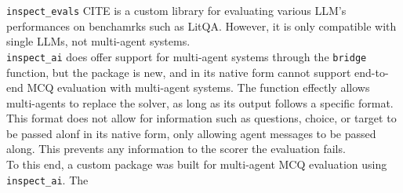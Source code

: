 \texttt{inspect_evals} CITE is a custom library for evaluating various LLM's performances on benchamrks such as LitQA. However, it is only compatible with single LLMs, not multi-agent systems. \\

\texttt{inspect_ai} does offer support for multi-agent systems through the \texttt{bridge} function, but the package is new, and in its native form cannot support end-to-end MCQ evaluation with multi-agent systems. The  function effectly allows multi-agents to replace the solver, as long as its output follows a specific format.
This format does not allow for information such as questions, choice, or target to be passed alonf in its native form, only allowing agent messages to be passed along. 
This prevents any information to the scorer the evaluation fails. \\

To this end, a custom package was built for multi-agent MCQ evaluation using \texttt{inspect_ai}. The 

